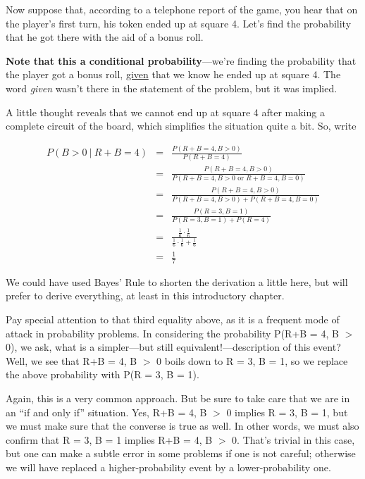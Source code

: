 Now suppose that, according to a telephone report of the game, you hear
that on the player's first turn, his token ended up at square 4.  Let's 
find the probability that he got there with the aid of a bonus roll.

{\bf Note that this a conditional probability}---we're finding the
probability that the player got a bonus roll, \underline{given} that we
know he ended up at square 4.  The word {\it given} wasn't there in the
statement of the problem, but it was implied.

A little thought reveals that we cannot end up at square 4 after making
a complete circuit of the board, which simplifies the situation quite a
bit.  So, write

\begin{eqnarray}
\label{condboard}
P(B > 0 ~|~ R+B = 4) &=& \frac{P(R+B 
= 4, B > 0)}{P(R+B=4)} \\ &=& \frac{P(R+B = 4, B > 0)}{P(R+B = 4, B > 0 \textrm{ or } R+B = 4, B = 0)} \\
&=& \frac{P(R+B = 4, B > 0)}{P(R+B = 4, B > 0) + P(R+B = 4, B = 0)} \\
&=& \frac{P(R = 3, B = 1)}{P(R = 3, B = 1) + P(R = 4)} \\
&=& \frac
{\frac{1}{6} \cdot \frac{1}{6}}
{\frac{1}{6} \cdot \frac{1}{6} + \frac{1}{6}} \\
&=& \frac{1}{7}
\end{eqnarray}

We could have used Bayes' Rule to shorten the derivation a little here,
but will prefer to derive everything, at least in this introductory
chapter.

Pay special attention to that third equality above, as it is a frequent
mode of attack in probability problems.  In considering the probability
P(R+B = 4, B $>$ 0), we ask, what is a simpler---but still
equivalent!---description of this event?  Well, we see that R+B = 4, B
$>$ 0 boils down to R = 3, B = 1, so we replace the above probability
with P(R = 3, B = 1).

Again, this is a very common approach.  But be sure to take care that we
are in an ``if and only if'' situation.  Yes, R+B = 4, B $>$ 0 implies R
= 3, B = 1, but we must make sure that the converse is true as well.  In
other words, we must also confirm that R = 3, B = 1 implies R+B = 4, B
$>$ 0.  That's trivial in this case, but one can make a subtle error in
some problems if one is not careful; otherwise we will have replaced a
higher-probability event by a lower-probability one.

